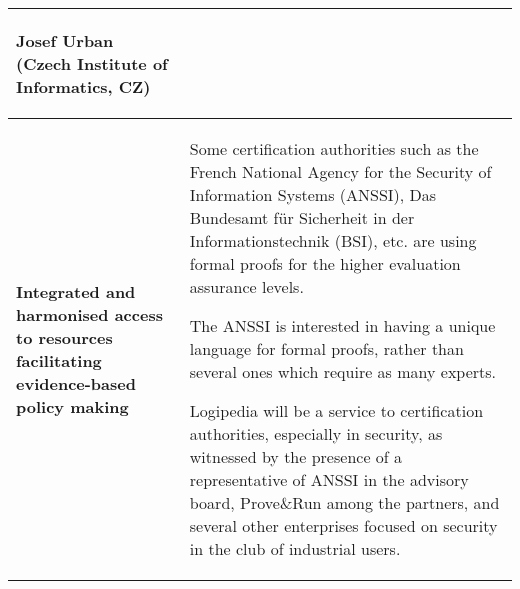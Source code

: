 \begin{longtable}{|p{}|p{}|}
\begin{shaded}
Josef Urban (Czech Institute of Informatics, CZ)
\end{shaded}
\\
\hline {\bf Integrated and harmonised access to resources facilitating
  evidence-based policy making} & Some certification authorities such
as the French National Agency for the Security of Information Systems
(ANSSI), Das Bundesamt für Sicherheit in der Informationstechnik (BSI), etc.
are using formal proofs for the higher evaluation assurance levels. 

The ANSSI is interested in having a unique language for formal proofs,
rather than several ones which require as many experts.

Logipedia will be a service to certification authorities, especially
in security, as witnessed by the presence of a representative of ANSSI
in the advisory board, Prove\&Run among the partners, and several
other enterprises focused on security in the club of industrial users.


\end{longtable}
